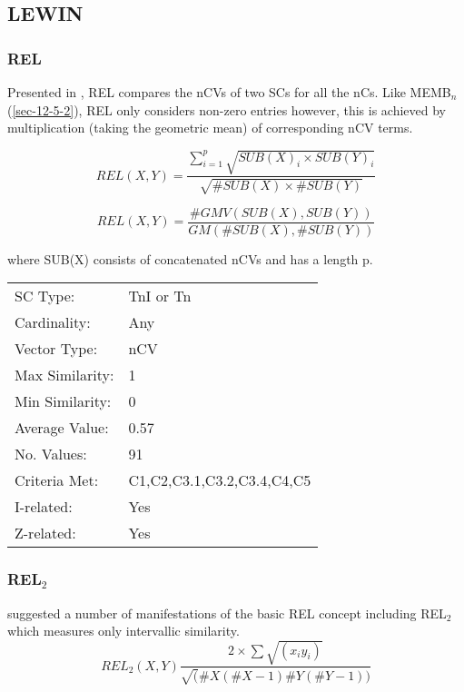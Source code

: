 \documentclass{article}
\begin{document}
\subsection{LEWIN}
\label{sec-12-7}
\subsubsection{REL}
\label{sec-12-7-1}

Presented in \citet{Lewin1979}, REL compares the nCVs of two SCs for
all the nCs. Like MEMB$_{n}$ (\ref{sec-12-5-2}), REL only considers non-zero
entries however, this is achieved by multiplication (taking the
geometric mean) of corresponding nCV terms.

$$REL(X,Y)=\frac{\sum_{i=1}^{p}{\sqrt{SUB(X)_{i}\times SUB(Y)_{i}}}}{\sqrt{\#SUB(X)\times \#SUB(Y)}}$$

$$REL(X,Y)=\frac{\#GMV(SUB(X),SUB(Y))}{GM(\#SUB(X),\#SUB(Y))}$$

where SUB(X) consists of concatenated nCVs and has a length p.

\begin{center}
\begin{tabular}{ll}
 SC Type:         &  TnI or Tn                   \\
 Cardinality:     &  Any                         \\
 Vector Type:     &  nCV                         \\
 Max Similarity:  &  1                           \\
 Min Similarity:  &  0                           \\
 Average Value:   &  0.57                        \\
 No. Values:      &  91                          \\
 Criteria Met:    &  C1,C2,C3.1,C3.2,C3.4,C4,C5  \\
 I-related:       &  Yes                         \\
 Z-related:       &  Yes                         \\
\end{tabular}
\end{center}
\subsubsection{REL$_{2}$}
\label{sec-12-7-2}

\citet{Rahn1979} suggested a number of manifestations of the basic REL
concept including REL$_{2}$ which measures only intervallic similarity.
$$ REL_{2}(X,Y)\frac{2\times\sum\sqrt{(x_{i}y_{i})}}{\sqrt(\#X(\#X-1)\#Y(\#Y-1))} $$
\end{document}
